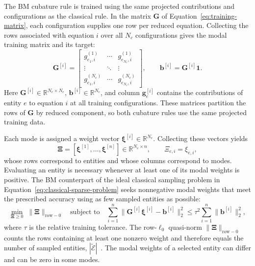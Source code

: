 \documentclass[a4paper,12pt]{article}
\newcommand{\vect}[1]{\boldsymbol{#1}}
\newcommand{\matr}[1]{\boldsymbol{#1}}
\begin{document}
The BM cubature rule is trained using the same projected contributions and configurations as the classical rule. In the matrix $\matr{G}$ of Equation~\eqref{eq:training-matrix}, each configuration supplies one row per reduced equation. Collecting the rows associated with equation $i$ over all $N_c$ configurations gives the modal training matrix and its target:
\begin{equation}
 \matr{G}^{[i]}=
 \begin{bmatrix}
 g_{e_1,i}^{(1)}&\cdots&g_{e_{N_e},i}^{(1)}\\
 \vdots&\ddots&\vdots\\
 g_{e_1,i}^{(N_c)}&\cdots&g_{e_{N_e},i}^{(N_c)}
 \end{bmatrix},
 \qquad
 \vect{b}^{[i]}=\matr{G}^{[i]}\vect{1}.
 \label{eq:modal-matrix}
\end{equation}
Here $\matr{G}^{[i]}\in\mathbb R^{N_c\times N_e}$, $\vect{b}^{[i]}\in\mathbb R^{N_c}$, and column $\vect{g}_e^{[i]}$ contains the contributions of entity $e$ to equation $i$ at all training configurations. These matrices partition the rows of $\matr{G}$ by reduced component, so both cubature rules use the same projected training data.

Each mode is assigned a weight vector $\vect{\xi}^{[i]}\in\mathbb R^{N_e}$. Collecting these vectors yields
\begin{equation}
 \matr{\Xi}=[\vect{\xi}^{[1]},\ldots,\vect{\xi}^{[n]}]
 \in\mathbb R^{N_e\times n},
 \qquad \Xi_{e,i}=\xi_{e,i},
\end{equation}
whose rows correspond to entities and whose columns correspond to modes. Evaluating an entity is necessary whenever at least one of its modal weights is positive. The BM counterpart of the ideal classical sampling problem in Equation~\eqref{eq:classical-sparse-problem} seeks nonnegative modal weights that meet the prescribed accuracy using as few sampled entities as possible:
\begin{equation}
 \underset{\matr{\Xi}\geq0}{\min}\;\|\matr{\Xi}\|_{\mathrm{row}-0}
 \quad\text{subject to}\quad
 \sum_{i=1}^n\|\matr{G}^{[i]}\vect{\xi}^{[i]}-\vect{b}^{[i]}\|_2^2
 \leq\tau^2\sum_{i=1}^n\|\vect{b}^{[i]}\|_2^2,
 \label{eq:bm-sparse-problem}
\end{equation}
where $\tau$ is the relative training tolerance. The row-$\ell_0$ quasi-norm $\|\matr{\Xi}\|_{\mathrm{row}-0}$ counts the rows containing at least one nonzero weight and therefore equals the number of sampled entities, $|\widetilde{\mathcal E}|$~\cite{tropp2006simultaneous}. The modal weights of a selected entity can differ and can be zero in some modes.
\end{document}
